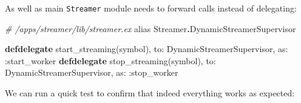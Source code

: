 \documentclass[
]{book}
\newenvironment{Shaded}{\begin{snugshade}}{\end{snugshade}}
\newcommand{\CommentTok}[1]{\textcolor[rgb]{0.56,0.35,0.01}{\textit{#1}}}
\newcommand{\ConstantTok}[1]{\textcolor[rgb]{0.00,0.00,0.00}{#1}}
\newcommand{\ImportTok}[1]{#1}
\newcommand{\KeywordTok}[1]{\textcolor[rgb]{0.13,0.29,0.53}{\textbf{#1}}}
\newcommand{\NormalTok}[1]{#1}
\newcommand{\OperatorTok}[1]{\textcolor[rgb]{0.81,0.36,0.00}{\textbf{#1}}}
\newcommand{\VariableTok}[1]{\textcolor[rgb]{0.00,0.00,0.00}{#1}}
\begin{document}
As well as main \texttt{Streamer} module needs to forward calls instead of delegating:

\begin{Shaded}
\begin{Highlighting}[]
  \CommentTok{\# /apps/streamer/lib/streamer.ex}
  \ImportTok{alias} \ConstantTok{Streamer}\OperatorTok{.}\ConstantTok{DynamicStreamerSupervisor}

  \KeywordTok{defdelegate}\NormalTok{ start\_streaming(symbol), }\VariableTok{to:} \ConstantTok{DynamicStreamerSupervisor}\NormalTok{, }\VariableTok{as:} \VariableTok{:start\_worker}
  \KeywordTok{defdelegate}\NormalTok{ stop\_streaming(symbol), }\VariableTok{to:} \ConstantTok{DynamicStreamerSupervisor}\NormalTok{, }\VariableTok{as:} \VariableTok{:stop\_worker}
\end{Highlighting}
\end{Shaded}

We can run a quick test to confirm that indeed everything works as expected:
\end{document}
